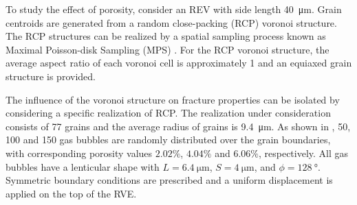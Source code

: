 To study the effect of porosity, consider an REV with side length \SI{40}{\micro\meter}. Grain centroids are generated from a random close-packing (RCP) voronoi structure. The RCP structures can be realized by a spatial sampling process known as Maximal Poisson-disk Sampling (MPS) \cite{Ebeida2012}. For the RCP voronoi structure, the average aspect ratio of each voronoi cell is approximately 1 and an equiaxed grain structure is provided.

The influence of the voronoi structure on fracture properties can be isolated by considering a specific realization of RCP. The realization under consideration consists of 77 grains and the average radius of grains is \SI{9.4}{\micro\meter}. As shown in , 50, 100 and 150 gas bubbles are randomly distributed over the grain boundaries, with corresponding porosity values $2.02\%$, $4.04\%$ and $6.06\%$, respectively. All gas bubbles have a lenticular shape with $L = \SI{6.4}{\micro\meter}$, $S = \SI{4}{\micro\meter}$, and $\phi=\SI{128}{\degree}$. Symmetric boundary conditions are prescribed and a uniform displacement is applied on the top of the RVE.

